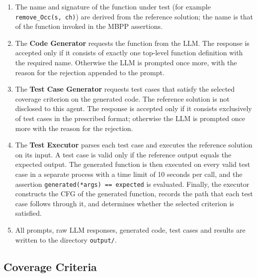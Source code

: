 \documentclass[11pt, a4paper]{article}
\begin{document}
\begin{enumerate}
    \item The name and signature of the function under test (for example \texttt{remove\_Occ(s, ch)}) are derived from the reference solution; the name is that of the function invoked in the MBPP assertions.
    \item The \textbf{Code Generator} requests the function from the LLM. The response is accepted only if it consists of exactly one top-level function definition with the required name. Otherwise the LLM is prompted once more, with the reason for the rejection appended to the prompt.
    \item The \textbf{Test Case Generator} requests test cases that satisfy the selected coverage criterion on the generated code. The reference solution is not disclosed to this agent. The response is accepted only if it consists exclusively of test cases in the prescribed format; otherwise the LLM is prompted once more with the reason for the rejection.
    \item The \textbf{Test Executor} parses each test case and executes the reference solution on its input. A test case is valid only if the reference output equals the expected output. The generated function is then executed on every valid test case in a separate process with a time limit of 10 seconds per call, and the assertion \texttt{generated(*args) == expected} is evaluated. Finally, the executor constructs the CFG of the generated function, records the path that each test case follows through it, and determines whether the selected criterion is satisfied.
    \item All prompts, raw LLM responses, generated code, test cases and results are written to the directory \texttt{output/}.
\end{enumerate}

\subsection{Coverage Criteria}
\end{document}
